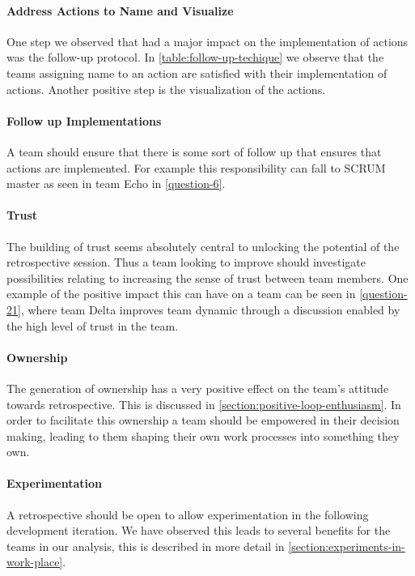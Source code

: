 \paragraph{Address Actions to Name and Visualize}
One step we observed that had a major impact on the implementation of actions was the follow-up protocol. In \autoref{table:follow-up-techique} we observe that the teams assigning name to an action are satisfied with their implementation of actions. Another positive step is the visualization of the actions.

\paragraph{Follow up Implementations}
A team should ensure that there is some sort of follow up that ensures that actions are implemented. For example this responsibility can fall to SCRUM master as seen in team Echo in \autoref{question-6}.

\paragraph{Trust}
The building of trust seems absolutely central to unlocking the potential of the retrospective session. Thus a team looking to improve should investigate possibilities relating to increasing the sense of trust between team members. One example of the positive impact this can have on a team can be seen in \autoref{question-21}, where team Delta improves team dynamic through a discussion enabled by the high level of trust in the team.

\paragraph{Ownership}
The generation of ownership has a very positive effect on the team's attitude towards retrospective. This is discussed in \autoref{section:positive-loop-enthusiasm}. In order to facilitate this ownership a team should be empowered in their decision making, leading to them shaping their own work processes into something they own.

\paragraph{Experimentation}
A retrospective should be open to allow experimentation in the following development iteration. We have observed this leads to several benefits for the teams in our analysis, this is described in more detail in \autoref{section:experiments-in-work-place}. 


